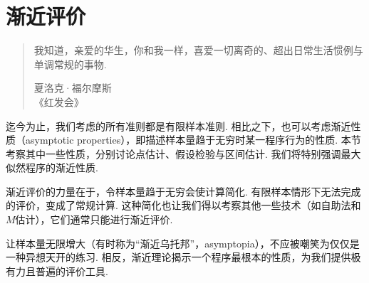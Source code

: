 \documentclass[UTF8,12pt]{ctexart}
\theoremstyle{plain}
\numberwithin{equation}{subsection}
\numberwithin{figure}{subsection}
\numberwithin{table}{subsection}
\newcommand{\sourcepageanchor}[1]{\phantomsection\label{src:#1}}
\providecommand{\sourcepageanchor}[1]{\phantomsection\label{src:#1}}
\begin{document}
\setcounter{section}{9}
\section{渐近评价}\label{sec:10}
\sourcepageanchor{408}
\begin{quote}
我知道，亲爱的华生，你和我一样，喜爱一切离奇的、超出日常生活惯例与单调常规的事物.
\begin{flushright}夏洛克·福尔摩斯\\《红发会》\end{flushright}
\end{quote}

迄今为止，我们考虑的所有准则都是有限样本准则. 相比之下，也可以考虑渐近性质（asymptotic properties），即描述样本量趋于无穷时某一程序行为的性质. 本节考察其中一些性质，分别讨论点估计、假设检验与区间估计. 我们将特别强调最大似然程序的渐近性质.

渐近评价的力量在于，令样本量趋于无穷会使计算简化. 有限样本情形下无法完成的评价，变成了常规计算. 这种简化也让我们得以考察其他一些技术（如自助法和$M$估计），它们通常只能进行渐近评价.

让样本量无限增大（有时称为“渐近乌托邦”，asymptopia），不应被嘲笑为仅仅是一种异想天开的练习. 相反，渐近理论揭示一个程序最根本的性质，为我们提供极有力且普遍的评价工具.







\end{document}
